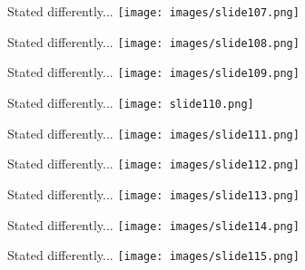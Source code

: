 \documentclass[10pt]{beamer}\usepackage[]{graphicx}\usepackage[]{xcolor}
\begin{document}
\begin{frame}{Stated differently...}
    \texttt{[image: images/slide107.png]}
\end{frame}

\begin{frame}{Stated differently...}
    \texttt{[image: images/slide108.png]}
\end{frame}

\begin{frame}{Stated differently...}
    \texttt{[image: images/slide109.png]}
\end{frame}

\begin{frame}{Stated differently...}
    \texttt{[image: slide110.png]}
\end{frame}

\begin{frame}{Stated differently...}
    \texttt{[image: images/slide111.png]}
\end{frame}

\begin{frame}{Stated differently...}
    \texttt{[image: images/slide112.png]}
\end{frame}

\begin{frame}{Stated differently...}
    \texttt{[image: images/slide113.png]}
\end{frame}

\begin{frame}{Stated differently...}
    \texttt{[image: images/slide114.png]}
\end{frame}

\begin{frame}{Stated differently...}
    \texttt{[image: images/slide115.png]}
\end{frame}
\end{document}
